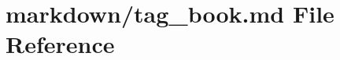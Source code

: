 \hypertarget{tag__book_8md}{}\section{markdown/tag\+\_\+book.md File Reference}
\label{tag__book_8md}
